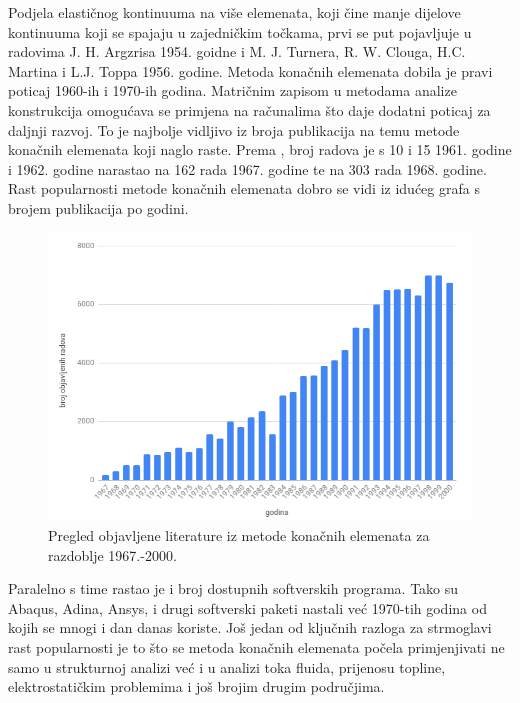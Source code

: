 \documentclass[a4paper,twoside,12pt]{memoir} %
\begin{document}
Podjela elastičnog kontinuuma na više elemenata, koji čine manje dijelove kontinuuma koji se spajaju u zajedničkim točkama, prvi se put pojavljuje u radovima J. H. Argzrisa 1954. goidne i M. J. Turnera, R. W. Clouga, H.C. Martina i L.J. Toppa 1956. godine. Metoda konačnih elemenata dobila je pravi poticaj 1960-ih i 1970-ih godina. Matričnim zapisom u metodama analize konstrukcija omogućava se primjena na računalima što daje dodatni poticaj za daljnji razvoj. To je najbolje vidljivo iz broja publikacija na temu metode konačnih elemenata koji naglo raste. Prema \cite{jurica_soric_117}, broj radova je s 10 i 15 1961. godine i 1962. godine narastao na 162 rada 1967. godine te na 303 rada 1968. godine. Rast popularnosti metode konačnih elemenata dobro se vidi iz idućeg grafa s brojem publikacija po godini.
\begin{figure}[h!t]
\begin{center}
\includegraphics[scale=0.5]{pictures/chapter_fem/broj_objavljenih_radova.png}
\caption{Pregled objavljene literature iz metode konačnih elemenata za razdoblje 1967.-2000. \cite{jurica_soric_76}}
\end{center}
\end{figure}
Paralelno s time rastao je i broj dostupnih softverskih programa. Tako su Abaqus, Adina, Ansys, i drugi softverski paketi nastali već 1970-tih godina od kojih se mnogi i dan danas koriste. Još jedan od ključnih razloga za strmoglavi rast popularnosti je to što se metoda konačnih elemenata počela primjenjivati ne samo u strukturnoj analizi već i u analizi toka fluida, prijenosu topline, elektrostatičkim problemima i još brojim drugim područjima. \par
\end{document}
